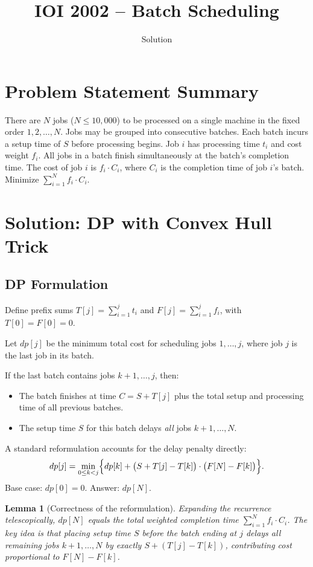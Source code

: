\documentclass[11pt,a4paper]{article}
\title{IOI 2002 -- Batch Scheduling}
\author{Solution}
\date{}
\newtheorem{lemma}[theorem]{Lemma}
\begin{document}
\maketitle

\section{Problem Statement Summary}
There are $N$ jobs ($N \le 10{,}000$) to be processed on a single
machine in the fixed order $1, 2, \ldots, N$. Jobs may be grouped into
consecutive batches. Each batch incurs a setup time of $S$ before
processing begins. Job $i$ has processing time $t_i$ and cost weight
$f_i$. All jobs in a batch finish simultaneously at the batch's
completion time. The cost of job $i$ is $f_i \cdot C_i$, where $C_i$
is the completion time of job $i$'s batch. Minimize
$\sum_{i=1}^{N} f_i \cdot C_i$.

\section{Solution: DP with Convex Hull Trick}

\subsection{DP Formulation}
Define prefix sums $T[j] = \sum_{i=1}^{j} t_i$ and
$F[j] = \sum_{i=1}^{j} f_i$, with $T[0] = F[0] = 0$.

Let $dp[j]$ be the minimum total cost for scheduling jobs
$1, \ldots, j$, where job $j$ is the last job in its batch.

If the last batch contains jobs $k{+}1, \ldots, j$, then:
\begin{itemize}
  \item The batch finishes at time
        $C = S + T[j]$ plus the total setup and processing time of all
        previous batches.
  \item The setup time $S$ for this batch delays \emph{all} jobs
        $k{+}1, \ldots, N$.
\end{itemize}

A standard reformulation accounts for the delay penalty directly:
\[
  dp[j] = \min_{0 \le k < j}
  \Bigl\{ dp[k] + \bigl(S + T[j] - T[k]\bigr)
  \cdot \bigl(F[N] - F[k]\bigr) \Bigr\}.
\]
Base case: $dp[0] = 0$. Answer: $dp[N]$.

\begin{lemma}[Correctness of the reformulation]
Expanding the recurrence telescopically, $dp[N]$ equals the total
weighted completion time $\sum_{i=1}^{N} f_i \cdot C_i$.
The key idea is that placing setup time $S$ before the batch ending at
$j$ delays all remaining jobs $k{+}1, \ldots, N$ by exactly
$S + (T[j] - T[k])$, contributing cost proportional to
$F[N] - F[k]$.
\end{lemma}
\end{document}
